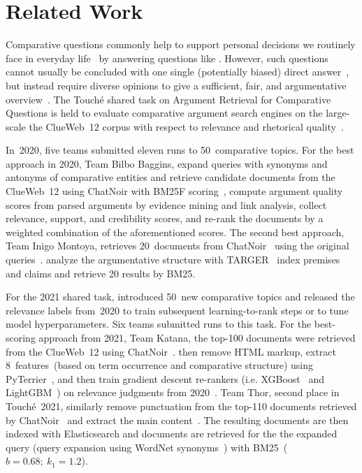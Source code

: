 \section{Related Work}

Comparative questions commonly help to support personal decisions we routinely face in everyday life~\cite{BondarenkoFBGAPBSWPH2020,BondarenkoGFBAPBSWPH2021,BondarenkoFKSGBPBSWPH2022} by answering questions like .
However, such questions cannot usually be concluded with one single (potentially biased) direct answer~\cite{PotthastHS2020}, but instead require diverse opinions to give a sufficient, fair, and argumentative overview~\cite{BondarenkoFBGAPBSWPH2020}.
The Touché shared task on Argument Retrieval for Comparative Questions is held to evaluate comparative argument search engines on the large-scale the ClueWeb~12 corpus with respect to relevance and rhetorical quality~\cite{BondarenkoFBGAPBSWPH2020,BondarenkoGFBAPBSWPH2021,BondarenkoFKSGBPBSWPH2022}.

In~2020, five teams submitted eleven runs to 50~comparative topics.
For the best approach in 2020, Team Bilbo Baggins, \citet{AbyeST2020} expand queries with synonyms and antonyms of comparative entities and retrieve candidate documents from the ClueWeb~12 using ChatNoir with BM25F scoring~\cite{PotthastHSGMTW2012,BevendorffSHP2018}, compute argument quality scores from parsed arguments by evidence mining and link analysis, collect relevance, support, and credibility scores, and re-rank the documents by a weighted combination of the aforementioned scores.
The second best approach, Team Inigo Montoya, retrieves 20~documents from ChatNoir~\cite{BevendorffSHP2018} using the original queries~\cite{Huck2020}. \citeauthor{Huck2020} analyze the argumentative structure
with TARGER~\cite{ChernodubOHBHBP2019} index premises and claims and retrieve 20 results by BM25.

For the 2021 shared task, \citeauthor{BondarenkoGFBAPBSWPH2021} introduced 50~new comparative topics and released the relevance labels from~2020 to train subsequent learning-to-rank steps or to tune model hyperparameters.
Six teams submitted runs to this task.
For the best-scoring approach from 2021, Team Katana, the top-100 documents were retrieved from the ClueWeb~12 using ChatNoir~\cite{BevendorffSHP2018}. \citet{ChekalinaP2021} then remove HTML markup, extract 8~features~(based on term occurrence and comparative structure) using PyTerrier~\todocite, and then train gradient descent re-rankers (i.e. XGBoost~\cite{ChenG2016} and LightGBM~\cite{KeMFWCMYL2017}) on relevance judgments from 2020~\cite{ChekalinaP2021}.
Team Thor, second place in Touché~2021, similarly remove punctuation from the top-110 documents retrieved by ChatNoir~\cite{BevendorffSHP2018} and extract the main content~\cite{ShirshakovaW2021}. The resulting documents are then indexed with Elasticsearch and documents are retrieved for the the expanded query (query expansion using WordNet synonyms~\cite{Miller1992}) with BM25~(\( b = 0.68;~k_1 = 1.2 \)).

